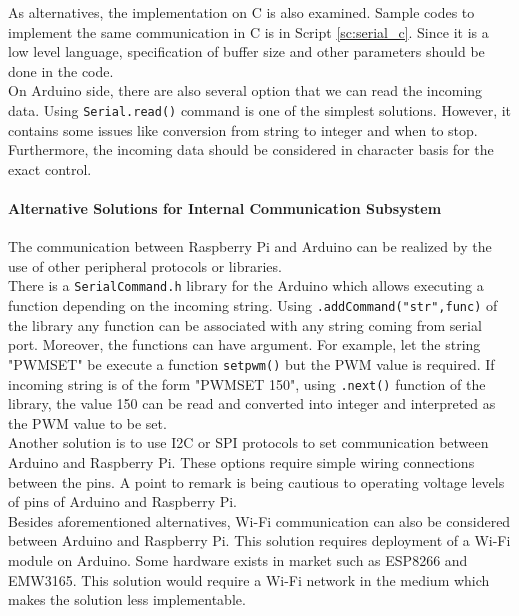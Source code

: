 \documentclass[a4paper,12pt]{article}
\begin{document}
	
	As alternatives, the implementation on C is also examined.	Sample codes to implement the same communication in C is in Script \ref{sc:serial_c}. Since it is a low level language, specification of buffer size and other parameters should be done in the code.\\

	On Arduino  side, there are also several option that we can read the incoming data. Using \texttt{Serial.read()}  command is one of the simplest solutions. However, it contains some issues like conversion from string to integer and when to stop. Furthermore, the incoming data should be considered in character basis for the exact control.  
	
	\paragraph{Alternative Solutions for Internal Communication Subsystem}
		The communication between Raspberry Pi and Arduino can be realized by the use of other peripheral protocols or libraries.\\
	
		There is a \texttt{SerialCommand.h} library for the Arduino which allows executing a function depending on the incoming string. Using \lstinline|.addCommand("str",func)| of the library any function can be associated with any string coming from serial port. Moreover, the functions can have argument. For example, let the string "PWMSET" be execute a function \lstinline|setpwm()| but the PWM value is required. If incoming string is of the form "PWMSET 150", using \lstinline|.next()| function of the library, the value 150 can be read and converted into integer and interpreted as the PWM value to be set.\\
		
		Another solution is to use I2C or SPI protocols to set communication between Arduino and Raspberry Pi. These options require simple wiring connections between the pins. A point to remark is being cautious to operating voltage levels of pins of Arduino and Raspberry Pi.\\
		
		Besides aforementioned alternatives, Wi-Fi communication can also be considered between Arduino and Raspberry Pi. This solution requires deployment of a Wi-Fi module on Arduino. Some hardware exists in market such as ESP8266 and EMW3165. This solution would require a Wi-Fi network in the medium which makes the solution less implementable.\\
		
\end{document}
